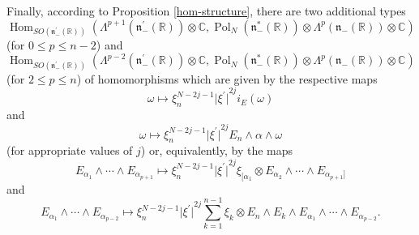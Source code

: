 \documentclass[a4paper,12pt,reqno]{amsart}
\numberwithin{theorem}{subsection}
\numberwithin{equation}{section}
\begin{document}
Finally, according to Proposition \ref{hom-structure}, there are two additional
types
\begin{equation*}
   {\operatorname{Hom}}_{SO({{\mathfrak n}}_-^\prime({\mathbb{R}}))}(\Lambda^{p+1}({{\mathfrak n}}_-^\prime({\mathbb{R}})) \otimes {\mathbb{C}},
   {\operatorname{Pol}}_N({{\mathfrak n}}_-^*({\mathbb{R}})) \otimes \Lambda^p({{\mathfrak n}}_-({\mathbb{R}})) \otimes {\mathbb{C}})
\end{equation*}
(for $0 \le p \le n-2$) and
\begin{equation*}
   {\operatorname{Hom}}_{SO({{\mathfrak n}}_-^\prime({\mathbb{R}}))}(\Lambda^{p-2}({{\mathfrak n}}_-^\prime({\mathbb{R}})) \otimes {\mathbb{C}},
   {\operatorname{Pol}}_N({{\mathfrak n}}_-^*({\mathbb{R}})) \otimes \Lambda^p({{\mathfrak n}}_-({\mathbb{R}})) \otimes {\mathbb{C}})
\end{equation*}
(for $2 \le p \le n$) of homomorphisms which are given by the respective maps
\begin{equation}\label{type-3-N-gen}
   \omega \mapsto \xi_n^{N-2j-1} {\lvert{\xi^\prime}\rvert}^{2j} i_E(\omega)
\end{equation}
and
\begin{equation}\label{type-4-N-gen}
   \omega \mapsto \xi_n^{N-2j-1} {\lvert{\xi^\prime}\rvert}^{2j} E_n \wedge \alpha \wedge \omega
\end{equation}
(for appropriate values of $j$) or, equivalently, by the maps
\begin{equation}\label{type-3-N}
   E_{\alpha_1}\wedge \cdots \wedge E_{\alpha_{p+1}} \mapsto \xi_n^{N-2j-1} {\lvert{\xi^\prime}\rvert}^{2j}
   \xi_{[\alpha_1}\otimes E_{\alpha_2}\wedge\cdots\wedge E_{\alpha_{p+1}]}
\end{equation}
and
\begin{equation}\label{type-4-N}
   E_{\alpha_1}\wedge \cdots \wedge E_{\alpha_{p-2}} \mapsto \xi_n^{N-2j-1} {\lvert{\xi^\prime}\rvert}^{2j}
   \sum_{k=1}^{n-1} \xi_k \otimes E_n \wedge E_k \wedge E_{\alpha_1}\wedge\cdots\wedge
   E_{\alpha_{p-2}}.
\end{equation}
\end{document}
